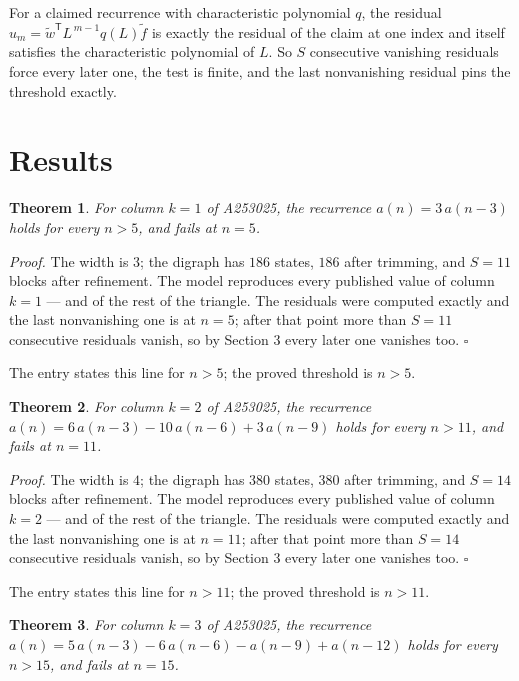 \documentclass[11pt]{article}
\newtheorem{theorem}{Theorem}
\theoremstyle{definition}
\begin{document}
For a claimed recurrence with characteristic polynomial $q$, the residual $u_m = \tilde w^{\mathsf T}L^{\,m-1}q(L)\tilde f$ is exactly the residual of the claim at one index and itself satisfies the characteristic polynomial of $L$. So $S$ consecutive vanishing residuals force every later one, the test is finite, and the last nonvanishing residual pins the threshold exactly.

\section{Results}

\begin{theorem} For column $k = 1$ of A253025, the recurrence $a(n) = 3\,a(n-3)$ holds for every $n > 5$, and fails at $n = 5$.\end{theorem}

{\itshape Proof.} The width is $3$; the digraph has $186$ states, $186$ after trimming, and $S = 11$ blocks after refinement. The model reproduces every published value of column $k = 1$ --- and of the rest of the triangle. The residuals were computed exactly and the last nonvanishing one is at $n = 5$; after that point more than $S = 11$ consecutive residuals vanish, so by Section 3 every later one vanishes too. $\square$

The entry states this line for $n > 5$; the proved threshold is $n > 5$.

\begin{theorem} For column $k = 2$ of A253025, the recurrence $a(n) = 6\,a(n-3) - 10\,a(n-6) + 3\,a(n-9)$ holds for every $n > 11$, and fails at $n = 11$.\end{theorem}

{\itshape Proof.} The width is $4$; the digraph has $380$ states, $380$ after trimming, and $S = 14$ blocks after refinement. The model reproduces every published value of column $k = 2$ --- and of the rest of the triangle. The residuals were computed exactly and the last nonvanishing one is at $n = 11$; after that point more than $S = 14$ consecutive residuals vanish, so by Section 3 every later one vanishes too. $\square$

The entry states this line for $n > 11$; the proved threshold is $n > 11$.

\begin{theorem} For column $k = 3$ of A253025, the recurrence $a(n) = 5\,a(n-3) - 6\,a(n-6) - a(n-9) + a(n-12)$ holds for every $n > 15$, and fails at $n = 15$.\end{theorem}
\end{document}
